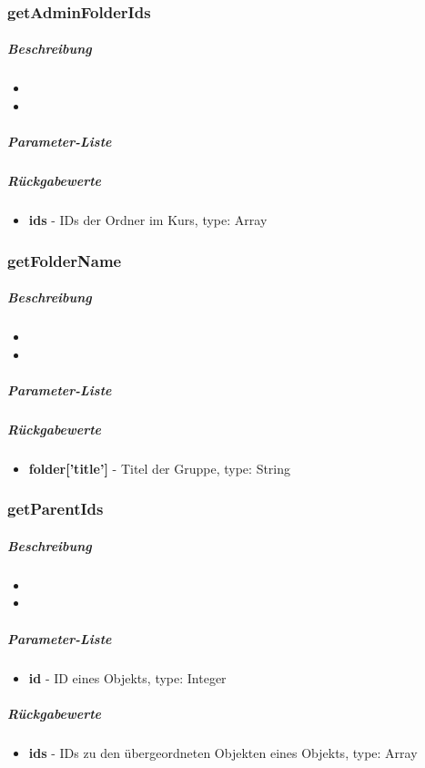 \subsubsection*{getAdminFolderIds}\label{getAdminFolderIdsLGUI}
\subparagraph{Beschreibung}
\begin{itemize}
	\item[] \noindent{} 
	\item[] 
\end{itemize}
\subparagraph{Parameter-Liste}
\subparagraph{Rückgabewerte}
\begin{itemize}
	\item[] \textbf{ids} - IDs der Ordner im Kurs, type: Array
\end{itemize}

\subsubsection*{getFolderName}\label{getFolderNameLGUI}
\subparagraph{Beschreibung}
\begin{itemize}
	\item[] \noindent{} 
	\item[] 
\end{itemize}
\subparagraph{Parameter-Liste}
\subparagraph{Rückgabewerte}
\begin{itemize}
	\item[] \textbf{folder['title']} - Titel der Gruppe, type: String 
\end{itemize}

\subsubsection*{getParentIds}\label{getParentIdsLGUI}
\subparagraph{Beschreibung}
\begin{itemize}
	\item[] \noindent{} 
	\item[] 
\end{itemize}
\subparagraph{Parameter-Liste}
\begin{itemize}
	\item[] \textbf{id} - ID eines Objekts, type: Integer 
\end{itemize}
\subparagraph{Rückgabewerte}
\begin{itemize}
	\item[] \textbf{ids} - IDs zu den übergeordneten Objekten eines Objekts, type: Array
\end{itemize}

